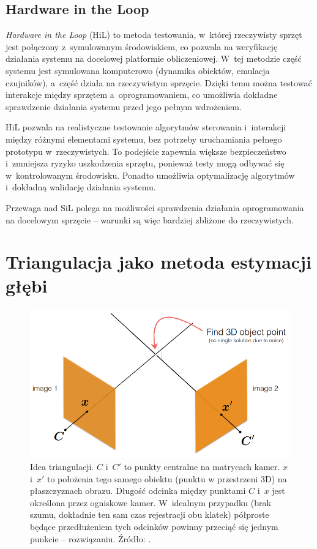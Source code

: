 



\subsection{Hardware in the Loop}
\label{subsec:hil}


\textit{Hardware in the Loop} (HiL) to metoda testowania, w~której rzeczywisty sprzęt jest połączony z~symulowanym środowiskiem, co pozwala na weryfikację działania systemu na docelowej platformie obliczeniowej. W~tej metodzie część systemu jest symulowana komputerowo (dynamika obiektów, emulacja czujników), a~część działa na rzeczywistym sprzęcie. Dzięki temu można testować interakcje między sprzętem a~oprogramowaniem, co umożliwia dokładne sprawdzenie działania systemu przed jego pełnym wdrożeniem.

HiL pozwala na realistyczne testowanie algorytmów sterowania i~interakcji między różnymi elementami systemu, bez potrzeby uruchamiania pełnego prototypu w~rzeczywistych. To podejście zapewnia większe bezpieczeństwo i~zmniejsza ryzyko uszkodzenia sprzętu, ponieważ testy mogą odbywać się w~kontrolowanym środowisku. Ponadto umożliwia optymalizację algorytmów i~dokładną walidację działania systemu.

Przewaga nad SiL polega na możliwości sprawdzenia działania oprogramowania na docelowym sprzęcie -- warunki są więc bardziej zbliżone do rzeczywistych.





\section{Triangulacja jako metoda estymacji głębi}
\begin{figure}
    \centering
    \includegraphics[width=0.8\linewidth]{images/triangulation.png}
    \caption{Idea triangulacji. $C$ i~$C'$ to punkty centralne na matrycach kamer. $x$ i~$x'$ to położenia tego samego obiektu (punktu w przestrzeni 3D) na płaszczyznach obrazu. Długość odcinka między punktami $C$ i~$x$ jest określona przez ogniskowe kamer. W~idealnym przypadku (brak szumu, dokładnie ten sam czas rejestracji obu klatek) półproste będące przedłużeniem tych odcinków powinny przeciąć się jednym punkcie -- rozwiązaniu. Źródło: \cite{triangulation}.}
    \label{fig:triangulation}
\end{figure}

